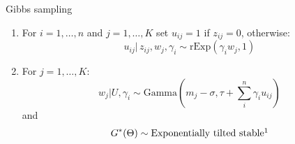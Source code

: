 \documentclass[aspectratio=169,xcolor=dvipsnames]{beamer}
\begin{document}
\begin{frame}{Gibbs sampling}
\vspace{5pt}
\begin{enumerate}[<+->]
    \item For $i= 1, \dots, n$ and $j= 1, \dots, K$ set $u_{ij}=1$ if $z_{ij}=0$, otherwise:
    $$
    u_{ij}| \, z_{ij}, w_{j}, \gamma_i \sim \text{rExp}(\gamma_{i} w_{j},1)
    $$
    \item For $j= 1, \dots, K$:
    $$ %
    w_{j}| U, \gamma_{i} \sim \text{Gamma}(m_{j} - \sigma, \tau + \sum_{i}^{n}\gamma_i u_{ij} ) 
    $$
    and
    $$ %
    G^{*}(\Theta) \sim \text{Exponentially tilted stable}\footnotemark
    $$
    \end{enumerate}
\end{frame}
\end{document}

